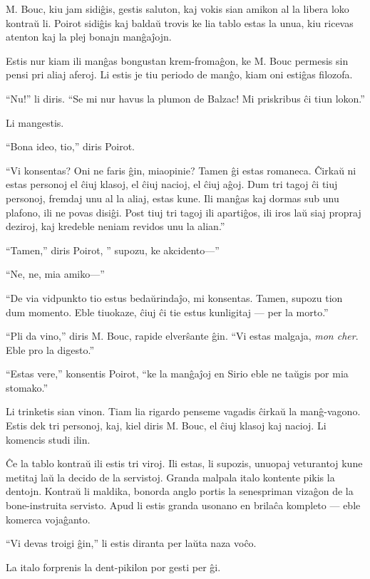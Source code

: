 M. Bouc, kiu jam sidiĝis, gestis saluton, kaj vokis sian amikon al la libera loko kontraŭ li. Poirot sidiĝis kaj baldaŭ trovis ke lia tablo estas la unua, kiu ricevas atenton kaj la plej bonajn manĝaĵojn.

Estis nur kiam ili manĝas bongustan krem-fromaĝon, ke M. Bouc permesis sin pensi pri aliaj aferoj. Li estis je tiu periodo de manĝo, kiam oni estiĝas filozofa.

``Nu!'' li diris. ``Se mi nur havus la plumon de Balzac! Mi priskribus ĉi tiun lokon.''

Li mangestis.

``Bona ideo, tio,'' diris Poirot.

``Vi konsentas? Oni ne faris ĝin, miaopinie? Tamen ĝi estas romaneca. Ĉirkaŭ ni estas personoj el ĉiuj klasoj, el ĉiuj nacioj, el ĉiuj aĝoj. Dum tri tagoj ĉi tiuj personoj, fremdaj unu al la aliaj, estas kune. Ili manĝas kaj dormas sub unu plafono, ili ne povas disiĝi. Post tiuj tri tagoj ili apartiĝos, ili iros laŭ siaj propraj deziroj, kaj kredeble neniam revidos unu la alian.''

``Tamen,'' diris Poirot, '' supozu, ke akcidento---''

``Ne, ne, mia amiko---''

``De via vidpunkto tio estus bedaŭrindaĵo, mi konsentas. Tamen, supozu tion dum momento. Eble tiuokaze, ĉiuj ĉi tie estus kunligitaj --- per la morto.''

``Pli da vino,'' diris M. Bouc, rapide elverŝante ĝin. ``Vi estas malgaja, \emph{mon cher}. Eble pro la digesto.''

``Estas vere,'' konsentis Poirot, ``ke la manĝaĵoj en Sirio eble ne taŭgis por mia stomako.''

Li trinketis sian vinon. Tiam lia rigardo penseme vagadis ĉirkaŭ la manĝ-vagono. Estis dek tri personoj, kaj, kiel diris M. Bouc, el ĉiuj klasoj kaj nacioj. Li komencis studi ilin.

Ĉe la tablo kontraŭ ili estis tri viroj. Ili estas, li supozis, unuopaj veturantoj kune metitaj laŭ la decido de la servistoj. Granda malpala italo kontente pikis la dentojn. Kontraŭ li maldika, bonorda anglo portis la senespriman vizaĝon de la bone-instruita servisto. Apud li estis granda usonano en brilaĉa kompleto --- eble komerca vojaĝanto.

``Vi devas troigi ĝin,'' li estis diranta per laŭta naza voĉo.

La italo forprenis la dent-pikilon por gesti per ĝi.


